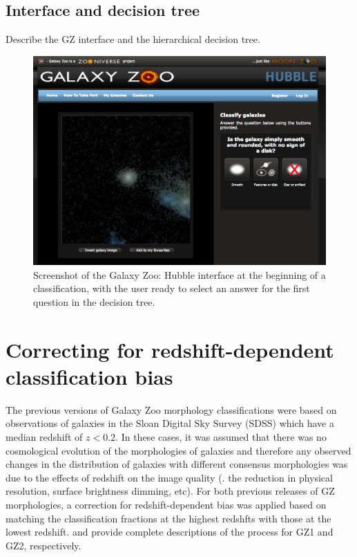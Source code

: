 \documentclass[twocolumn]{aastex6}
\begin{document}
\subsection{Interface and decision tree}\label{ssec:interface}

{\note Describe the GZ interface and the hierarchical decision tree.}

\begin{figure}
\center
\includegraphics[width=160mm]{figures/gzh_interface.png}
\caption{Screenshot of the Galaxy Zoo: Hubble interface at the beginning of a classification, with the user ready to select an answer for the first question in the decision tree.\label{fig:interface}}
\end{figure}


\section{Correcting for redshift-dependent classification bias}\label{sec:debiasing}

The previous versions of Galaxy Zoo morphology classifications \citep{lin08,wil13} were based on observations of galaxies in the Sloan Digital Sky Survey (SDSS) which have a median redshift of $z<0.2$. In these cases, it was assumed that there was no cosmological evolution of the morphologies of galaxies and therefore any observed changes in the distribution of galaxies with different consensus morphologies was due to the effects of redshift on the image quality (\ie. the reduction in physical resolution, surface brightness dimming, etc). For both previous releases of GZ morphologies, a correction for redshift-dependent bias was applied based on matching the classification fractions at the highest redshfts with those at the lowest redshift. \citet{bam09} and \citet{wil13} provide complete descriptions of the process for GZ1 and GZ2, respectively.
\end{document}

